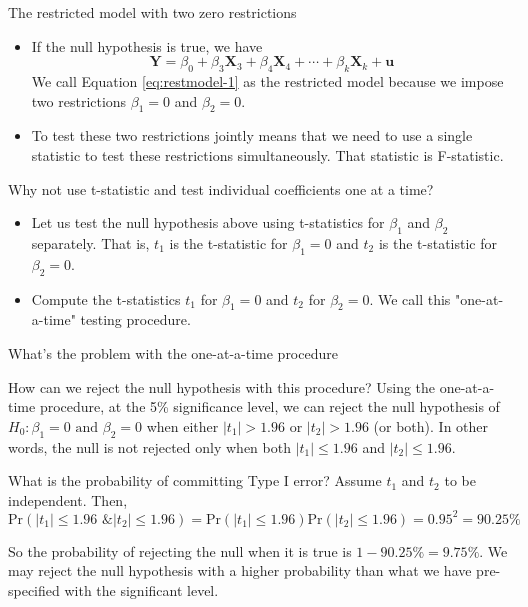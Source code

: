 \documentclass[presentation,10pt]{beamer}
\newcommand{\pr}{\mathrm{Pr}}
\begin{document}
\begin{frame}[label={sec:orgef6c912}]{The restricted model with two zero restrictions}
\begin{itemize}
\item If the null hypothesis is true, we have
\begin{equation}
\label{eq:restmodel-1}
\mathbf{Y} = \beta_0 + \beta_3 \mathbf{X}_3 + \beta_4 \mathbf{X}_4 + \cdots + \beta_k \mathbf{X}_k + \mathbf{u}
\end{equation}
We call Equation \eqref{eq:restmodel-1} as \alert{the restricted model}
because we impose two restrictions \(\beta_1 = 0\) and \(\beta_2 = 0\).

\item To test these two restrictions jointly means that we need to use a
single statistic to test these restrictions simultaneously. That
statistic is F-statistic.
\end{itemize}
\end{frame}

\begin{frame}[label={sec:orgc136249}]{Why not use t-statistic and test individual coefficients one at a time?}
\begin{itemize}
\item Let us test the null hypothesis above using t-statistics for \(\beta_1\)
and \(\beta_2\) separately. That is, \(t_1\) is the t-statistic for
\(\beta_1 = 0\) and \(t_2\) is the t-statistic for \(\beta_2 = 0\). \vspace{0.2cm}

\item Compute the t-statistics \(t_1\) for \(\beta_1 = 0\) and \(t_2\) for
\(\beta_2 = 0\). We call this "one-at-a-time" testing procedure.
\end{itemize}
\end{frame}

\begin{frame}[label={sec:orga54074e}]{What's the problem with the one-at-a-time procedure}
\begin{block}{How can we reject the null hypothesis with this procedure?}
Using the one-at-a-time procedure, at the 5\% significance level, we
can reject the null hypothesis of \(H_0: \beta_1 = 0 \text{ and }
  \beta_2 = 0\) when either \(|t_1| > 1.96\) or \(|t_2| > 1.96\) (or
both). In other words, the null is not rejected only when both
\(|t_1| \leq 1.96\) and \(|t_2| \leq 1.96\).
\end{block}

\begin{block}{What is the probability of committing Type I error?}
Assume \(t_1\) and \(t_2\) to be independent. Then,
\[\pr(|t_1| \leq 1.96 \text{ \& } |t_2| \leq 1.96) = \pr(|t_1| \leq
  1.96) \pr(|t_2| \leq 1.96) = 0.95^2 = 90.25\%\]

So the probability of rejecting the null when it is true is \(1 -
  90.25\% = 9.75\%\). We may reject the null hypothesis with a higher
probability than what we have pre-specified with the significant
level.
\end{block}
\end{frame}
\end{document}
